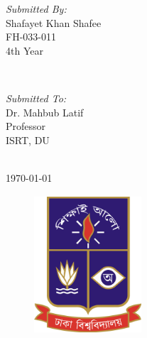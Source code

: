 \documentclass[
  12pt,
  oneside]{article}
\begin{document}
\begin{titlepage}
\begin{minipage}{0.4\textwidth}
\begin{flushleft} \large
\emph{Submitted By:}\\
Shafayet Khan Shafee \\FH-033-011\\4th Year
\end{flushleft}
\end{minipage}
~
\begin{minipage}{0.4\textwidth}
\begin{flushright} \large
\emph{Submitted To:} \\
Dr. Mahbub Latif\\Professor\\ISRT, DU
\end{flushright}
\end{minipage}\\[1cm]


{\large \today}\\[3cm]


\begin{figure}[hb]
  \centering
  \includegraphics[width=4cm, height=5.2cm]{../others/du_logo_high.JPG}
\end{figure}



\vfill

\end{titlepage}

{
\setcounter{tocdepth}{2}
\tableofcontents
}
\clearpage
\end{document}
